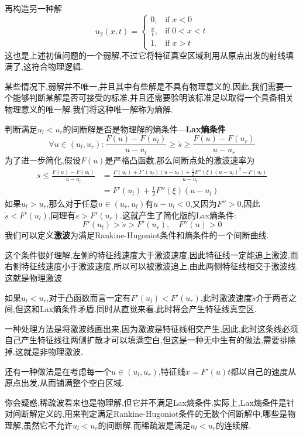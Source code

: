再构造另一种解
$$
u_2(x,t)=
\begin{cases}
    0,&\text{if}\; x<0\\
    \frac{x}{t},&\text{if}\; 0<x<t\\
    1,&\text{if}\; x>t
\end{cases}
$$
这也是上述初值问题的一个弱解,不过它将特征真空区域利用从原点出发的射线填满了,这符合物理逻辑.\par
某些情况下,弱解并不唯一,并且其中有些解是不具有物理意义的.因此,我们需要一个能够判断某解是否可接受的标准,并且还需要验明该标准足以取得一个具备相关物理意义的唯一解.我们将这种唯一解称为熵解.\par
判断满足$u_l<u_r$的间断解是否是物理解的熵条件---\textbf{Lax熵条件}
$$
\forall u\in (u_l,u_r):\frac{F(u)-F(u_l)}{u-u_l}\geqslant \dot{s}\geqslant \frac{F(u)-F(u_r)}{u-u_r}
$$
\qquad 为了进一步简化,假设$F(u)$是严格凸函数,那么间断点处的激波速率为
$$
\begin{aligned}
    \dot{s}\leqslant \frac{F(u)-F(u_l)}{u-u_l} &=\frac{F(u_l)+F'(u_l)(u-u_l)+\frac{1}{2}F''(\xi)(u-u_l)^2-F(u_l)}{u-u_l}\\
                                               &= F'(u_l)+\frac{1}{2}F''(\xi)(u-u_l)
\end{aligned}
$$
\qquad 如果$u_l>u_r$,那么对于任意$u\in (u_r,u_l)$有$u-u_l<0$,又因为$F''>0$,因此$\dot{s}<F'(u_l)$,同理有$\dot{s}>F'(u_r)$.这就产生了简化版的Lax熵条件:
$$
F'(u_l)>\dot{s}>F'(u_r),\quad F''(u)>0
$$
我们可以定义\textbf{激波}为满足Rankine-Hugoniot条件和熵条件的一个间断曲线.\par
这个条件很好理解,左侧的特征线速度大于激波速度,因此特征线一定能追上激波,而右侧特征线速度小于激波速度,所以可以被激波追上,由此两侧特征线相交于激波线.这就是物理激波\par
如果$u_l<u_r$,对于凸函数而言一定有$F'(u_l)<F'(u_r)$,此时激波速度$\dot{s}$介于两者之间,但这和Lax熵条件矛盾.同时从直觉来看,此时将会产生特征线真空区.\par
一种处理方法是将激波线画出来,因为激波是特征线相交产生,因此,此时这条线必须自己产生特征线往两侧扩散才可以填满空白,但这是一种无中生有的做法,需要排除掉.这就是非物理激波.\par
还有一种做法是在考虑每一个$u\in (u_l,u_r)$,特征线$x=F'(u)t$都以自己的速度从原点出发,从而铺满整个空白区域.\par
你会疑惑,稀疏波看来也是物理解,但它并不满足Lax熵条件.实际上,Lax熵条件是针对间断解定义的,用来判定满足Rankine-Hugoniot条件的无数个间断解中,哪些是物理解,虽然它不允许$u_l<u_r$的间断解.而稀疏波是满足$u_l<u_r$的连续解.\par
